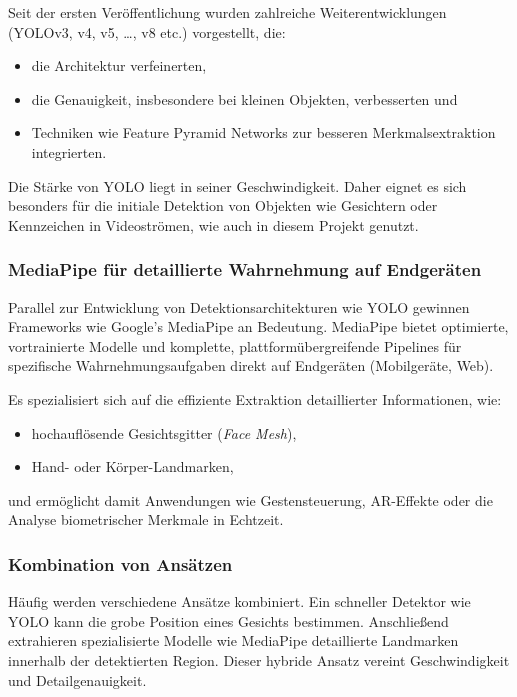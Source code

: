 Seit der ersten Veröffentlichung wurden zahlreiche Weiterentwicklungen (YOLOv3, v4, v5, \ldots, v8 etc.) vorgestellt, die:
\begin{itemize}
    \item die Architektur verfeinerten,
    \item die Genauigkeit, insbesondere bei kleinen Objekten, verbesserten und
    \item Techniken wie Feature Pyramid Networks zur besseren Merkmalsextraktion integrierten.
\end{itemize}

Die Stärke von YOLO liegt in seiner Geschwindigkeit. Daher eignet es sich besonders für die initiale Detektion von Objekten wie Gesichtern oder Kennzeichen in Videoströmen, wie auch in diesem Projekt genutzt.

\subsubsection{MediaPipe für detaillierte Wahrnehmung auf Endgeräten}

Parallel zur Entwicklung von Detektionsarchitekturen wie YOLO gewinnen Frameworks wie Google's MediaPipe an Bedeutung. MediaPipe bietet optimierte, vortrainierte Modelle und komplette, plattformübergreifende Pipelines für spezifische Wahrnehmungsaufgaben direkt auf Endgeräten (Mobilgeräte, Web). 

Es spezialisiert sich auf die effiziente Extraktion detaillierter Informationen, wie:
\begin{itemize}
    \item hochauflösende Gesichtsgitter (\textit{Face Mesh}),
    \item Hand- oder Körper-Landmarken,
\end{itemize}
und ermöglicht damit Anwendungen wie Gestensteuerung, AR-Effekte oder die Analyse biometrischer Merkmale in Echtzeit.

\subsubsection{Kombination von Ansätzen}

Häufig werden verschiedene Ansätze kombiniert. Ein schneller Detektor wie YOLO kann die grobe Position eines Gesichts bestimmen. Anschließend extrahieren spezialisierte Modelle wie MediaPipe detaillierte Landmarken innerhalb der detektierten Region. Dieser hybride Ansatz vereint Geschwindigkeit und Detailgenauigkeit.

